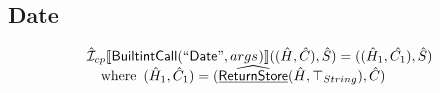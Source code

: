 \documentclass{article}
\newcommand{\SF}[1]{\mbox{\textsf{#1}}}
\newcommand{\wherec}[1]{{\rm where}\begin{array}[t]{l}#1\end{array}}
\newcommand{\aI}{\hat{\mathcal{I}}}
\newcommand{\lbr}{\llbracket}
\newcommand{\rbr}{\rrbracket}
\newcommand{\ahf}[1]{\widehat{\underline{\sf #1}}}
\begin{document}
\subsection{Date}
\[
\begin{array}{l}
\aI _{cp}\lbr \SF{BuiltintCall}(``\SF{Date}",args_{})\rbr((\hat{H},\hat{C}), \hat{S})
  = ((\hat{H}_1, \hat{C_1}), \hat{S})\\
\quad\wherec{
  (\hat{H}_1, \hat{C}_1) = (\ahf{ReturnStore}(\hat{H},\top_{String}), \hat{C})\\
  }\\
\\\\


\end{array}
\]

\[
\begin{array}{l}


\end{array}\]
\end{document}
